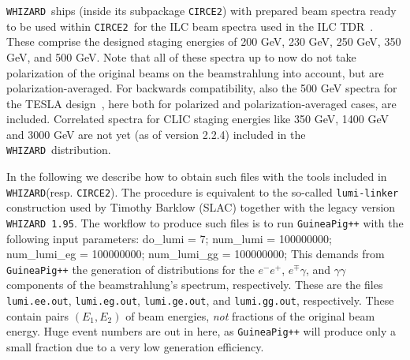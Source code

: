 \documentclass[12pt]{book}
\newenvironment{Code}%
  {\begingroup\footnotesize
   \quote
   \Verbatim[frame=single]}%
  {\endVerbatim
   \endquote
   \endgroup\noindent}
\newcommand{\ttt}[1]{\texttt{#1}}
\newcommand{\whizard}{\ttt{WHIZARD}}
\newcommand{\circetwo}{\ttt{CIRCE2}}
\begin{document}
\whizard\ ships (inside its subpackage \circetwo) with prepared beam
spectra ready to be used within \circetwo\ for the ILC beam spectra
used in the ILC
TDR~\cite{Behnke:2013xla,Baer:2013cma,Adolphsen:2013jya,Adolphsen:2013kya,Behnke:2013lya}. These
comprise the designed staging energies of 200 GeV, 230 GeV, 250 GeV,
350 GeV, and 500 GeV. Note that all of these spectra up to now do not
take polarization of the original beams on the beamstrahlung into
account, but are polarization-averaged. For backwards compatibility,
also the 500 GeV spectra for the TESLA
design~\cite{AguilarSaavedra:2001rg,Richard:2001qm}, here both for
polarized and polarization-averaged cases, are included. Correlated
spectra for CLIC staging energies like 350 GeV, 1400 GeV and 3000 GeV
are not yet (as of version 2.2.4) included in the \whizard\
distribution.

In the following we describe how to obtain such files with the tools
included in \whizard (resp. \circetwo). The procedure is equivalent to
the so-called \ttt{lumi-linker} construction used by Timothy
Barklow (SLAC) together with the legacy version \whizard\ttt{ 1.95}.
The workflow to produce such files is to run \ttt{GuineaPig++} with
the following input parameters:
\begin{Code}
  do_lumi = 7;
  num_lumi = 100000000;
  num_lumi_eg = 100000000;
  num_lumi_gg = 100000000;
\end{Code}
This demands from \ttt{GuineaPig++} the generation of distributions
for the $e^-e^+$, $e^\mp \gamma$, and $\gamma\gamma$ components of the
beamstrahlung's spectrum, respectively. These are the files
\ttt{lumi.ee.out}, \ttt{lumi.eg.out}, \ttt{lumi.ge.out}, and
\ttt{lumi.gg.out}, respectively. These contain pairs $(E_1, E_2)$
of beam energies, {\em not} fractions of the original beam
energy. Huge event numbers are out in here, as \ttt{GuineaPig++}
will produce only a small fraction due to a very low generation
efficiency.
\end{document}
